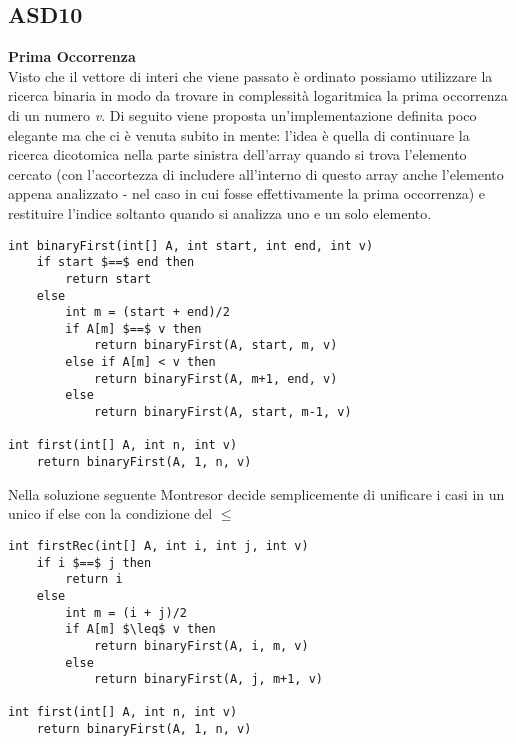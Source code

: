 \documentclass[../cheatSheetAlgoritmi.tex]{subfiles}
\begin{document}
\subsection{ASD10}
\textbf{Prima Occorrenza}\\
Visto che il vettore di interi che viene passato è ordinato possiamo utilizzare la ricerca binaria in modo da trovare in complessità logaritmica la prima occorrenza di un numero \textit{v}. Di seguito viene proposta un'implementazione definita poco elegante ma che ci è venuta subito in mente: l'idea è quella di continuare la ricerca dicotomica nella parte sinistra dell'array quando si trova l'elemento cercato (con l'accortezza di includere all'interno di questo array anche l'elemento appena analizzato - nel caso in cui fosse effettivamente la prima occorrenza) e restituire l'indice soltanto quando si analizza uno e un solo elemento.
\newpage
\begin{lstlisting}[caption=Prima Occorrenza]
int binaryFirst(int[] A, int start, int end, int v)
	if start $==$ end then
		return start
  	else
    	int m = (start + end)/2
    	if A[m] $==$ v then
      		return binaryFirst(A, start, m, v)
    	else if A[m] < v then
        	return binaryFirst(A, m+1, end, v)
      	else
        	return binaryFirst(A, start, m-1, v)

int first(int[] A, int n, int v)
	return binaryFirst(A, 1, n, v)
\end{lstlisting}
Nella soluzione seguente Montresor decide semplicemente di unificare i casi in un unico if else con la condizione del $\leq$
\begin{lstlisting}[caption=Prima Occorrenza (by Montresor)]
int firstRec(int[] A, int i, int j, int v)
	if i $==$ j then
    	return i
  	else
    	int m = (i + j)/2
    	if A[m] $\leq$ v then
      		return binaryFirst(A, i, m, v)
    	else
      		return binaryFirst(A, j, m+1, v)
      
int first(int[] A, int n, int v)
	return binaryFirst(A, 1, n, v)
\end{lstlisting}
\end{document}
